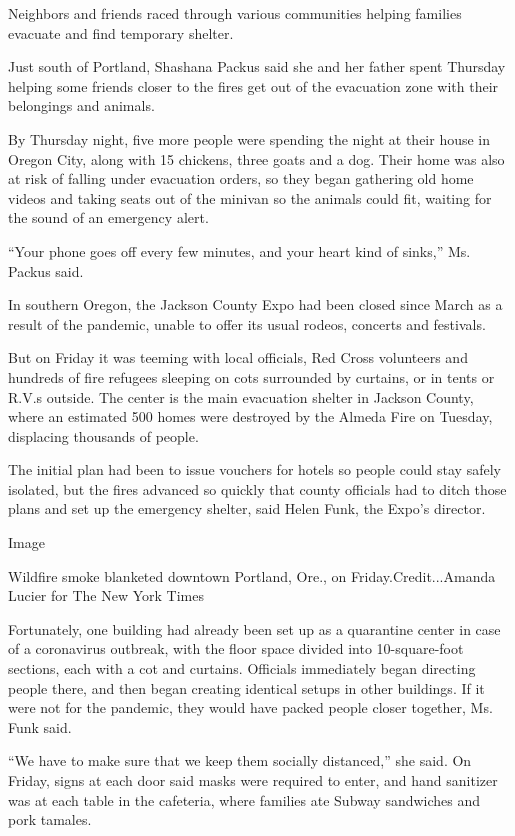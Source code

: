 Neighbors and friends raced through various communities helping families
evacuate and find temporary shelter.

Just south of Portland, Shashana Packus said she and her father spent
Thursday helping some friends closer to the fires get out of the
evacuation zone with their belongings and animals.

By Thursday night, five more people were spending the night at their
house in Oregon City, along with 15 chickens, three goats and a dog.
Their home was also at risk of falling under evacuation orders, so they
began gathering old home videos and taking seats out of the minivan so
the animals could fit, waiting for the sound of an emergency alert.

``Your phone goes off every few minutes, and your heart kind of sinks,''
Ms. Packus said.

In southern Oregon, the Jackson County Expo had been closed since March
as a result of the pandemic, unable to offer its usual rodeos, concerts
and festivals.

But on Friday it was teeming with local officials, Red Cross volunteers
and hundreds of fire refugees sleeping on cots surrounded by curtains,
or in tents or R.V.s outside. The center is the main evacuation shelter
in Jackson County, where an estimated 500 homes were destroyed by the
Almeda Fire on Tuesday, displacing thousands of people.

The initial plan had been to issue vouchers for hotels so people could
stay safely isolated, but the fires advanced so quickly that county
officials had to ditch those plans and set up the emergency shelter,
said Helen Funk, the Expo's director.

Image

Wildfire smoke blanketed downtown Portland, Ore., on
Friday.Credit...Amanda Lucier for The New York Times

Fortunately, one building had already been set up as a quarantine center
in case of a coronavirus outbreak, with the floor space divided into
10-square-foot sections, each with a cot and curtains. Officials
immediately began directing people there, and then began creating
identical setups in other buildings. If it were not for the pandemic,
they would have packed people closer together, Ms. Funk said.

``We have to make sure that we keep them socially distanced,'' she said.
On Friday, signs at each door said masks were required to enter, and
hand sanitizer was at each table in the cafeteria, where families ate
Subway sandwiches and pork tamales.

